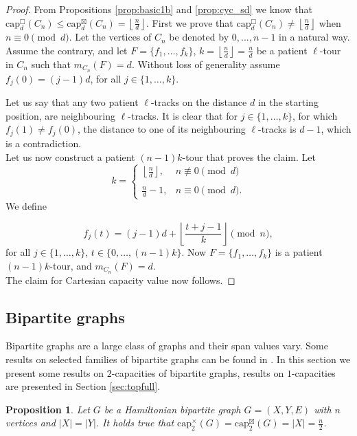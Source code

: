 \documentclass{article}
\newtheorem{proposition}[theorem]{Proposition}
\newcommand{\dcap}[2]{\mathrm{cap}^{\times}_{#1}(#2)}
\newcommand{\scap}[2]{\mathrm{cap}^{\boxtimes}_{#1}(#2)}
\newcommand{\ccap}[2]{\mathrm{cap}^{\mathbin{\Box}}_{#1}(#2)}
\begin{document}
\begin{proof}
    
From Propositions \ref{prop:basic1b} and \ref{prop:cyc_sd} we know that $\ccap{d}{C_n}\leq \scap{d}{C_n}=\left\lfloor\frac{n}{d}\right\rfloor$. 
First we prove that $\ccap{d}{C_n}\neq\left\lfloor\frac{n}{d}\right\rfloor$ when $n \equiv 0 \pmod d$. Let the vertices of $C_n$ be denoted by $0,...,n-1$ in a natural way. Assume the contrary, and let $F=\{f_1,\ldots,f_k\}$, $k=\left\lfloor\frac{n}{d}\right\rfloor=\frac{n}{d}$ be a patient $\ell$-tour in $C_n$ such that $m_{C_n}(F)= d$. Without loss of generality assume $f_j(0)=(j-1)d$, for all $j\in\{1,\ldots,k\}$. 
    
    Let us say that any two patient $\ell$-tracks on the distance $d$ in the starting position, are neighbouring $\ell$-tracks. It is clear that for $j\in\{1,\ldots,k\}$, for which $f_j(1)\neq f_j(0)$, the distance to one of its neighbouring $\ell$-tracks is $d-1$, which is a contradiction.\\

Let us now construct a patient $(n-1)k$-tour that proves the claim.
Let $$k=\left\{
	\begin{array}{ll}
		\left\lfloor\frac{n}{d}\right\rfloor,  & n \not\equiv 0 \pmod d \\
        \\
		\frac{n}{d} -1, & n \equiv 0 \pmod d. 
	\end{array}
\right. $$
We define
         
    $$f_j(t)=(j-1)d+\left\lfloor\frac{t+j-1}{k}\right\rfloor \pmod n,$$  for all $j\in\{1,\ldots,k\}$,  $t\in\{0,\ldots,(n-1)k\}$. Now $F=\{f_1,\ldots,f_k\}$ is a patient $(n-1)k$-tour, and $m_{C_n}(F)=d$.\\
    
    The claim for Cartesian capacity value now follows.
\end{proof} 

\subsection{Bipartite graphs}

Bipartite graphs are a large class of graphs and their span values vary. Some results on selected  families of bipartite graphs can be found in \cite{Erceg23, SuVo24}. In this section we present some results on $2$-capacities of bipartite graphs, results on $1$-capacities are presented in Section \ref{sec:topfull}. 

\begin{proposition}\label{prop:bipartite-Hamiltonian}
Let $G$ be a Hamiltonian bipartite graph $G=(X,Y, E)$ with $n$ vertices and $|X|=|Y|$. It holds true that $\dcap{2}{G} =\scap{2}{G} =|X|=\frac{n}{2}$.
\end{proposition}
\end{document}
